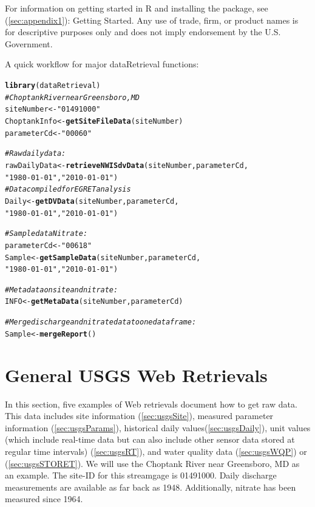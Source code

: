 \documentclass[a4paper,11pt]{article}\usepackage[]{graphicx}\usepackage[]{color}
\makeatletter
\newcommand{\hlstr}[1]{\textcolor[rgb]{0.192,0.494,0.8}{#1}}%
\newcommand{\hlcom}[1]{\textcolor[rgb]{0.678,0.584,0.686}{\textit{#1}}}%
\newcommand{\hlstd}[1]{\textcolor[rgb]{0.345,0.345,0.345}{#1}}%
\newcommand{\hlkwb}[1]{\textcolor[rgb]{0.69,0.353,0.396}{#1}}%
\newcommand{\hlkwd}[1]{\textcolor[rgb]{0.737,0.353,0.396}{\textbf{#1}}}%
\newenvironment{kframe}{%
 \def\at@end@of@kframe{}%
 \ifinner\ifhmode%
  \def\at@end@of@kframe{\end{minipage}}%
  \begin{minipage}{\columnwidth}%
 \fi\fi%
 \def\FrameCommand##1{\hskip\@totalleftmargin \hskip-\fboxsep
 \colorbox{shadecolor}{##1}\hskip-\fboxsep
     \hskip-\linewidth \hskip-\@totalleftmargin \hskip\columnwidth}%
 \MakeFramed {\advance\hsize-\width
   \@totalleftmargin\z@ \linewidth\hsize
   \@setminipage}}%
 {\par\unskip\endMakeFramed%
 \at@end@of@kframe}
\newenvironment{knitrout}{}{} %
\makeatother
\begin{document}
For information on getting started in R and installing the package, see (\ref{sec:appendix1}): Getting Started. Any use of trade, firm, or product names is for descriptive purposes only and does not imply endorsement by the U.S. Government.

A quick workflow for major dataRetrieval functions:

\begin{knitrout}
\color{fgcolor}\begin{kframe}
\begin{alltt}
\hlkwd{library}\hlstd{(dataRetrieval)}
\hlcom{# Choptank River near Greensboro, MD}
\hlstd{siteNumber} \hlkwb{<-} \hlstr{"01491000"}
\hlstd{ChoptankInfo} \hlkwb{<-} \hlkwd{getSiteFileData}\hlstd{(siteNumber)}
\hlstd{parameterCd} \hlkwb{<-} \hlstr{"00060"}

\hlcom{#Raw daily data:}
\hlstd{rawDailyData} \hlkwb{<-} \hlkwd{retrieveNWISdvData}\hlstd{(siteNumber,parameterCd,}
                      \hlstr{"1980-01-01"}\hlstd{,}\hlstr{"2010-01-01"}\hlstd{)}
\hlcom{# Data compiled for EGRET analysis}
\hlstd{Daily} \hlkwb{<-} \hlkwd{getDVData}\hlstd{(siteNumber,parameterCd,}
                      \hlstr{"1980-01-01"}\hlstd{,}\hlstr{"2010-01-01"}\hlstd{)}

\hlcom{# Sample data Nitrate:}
\hlstd{parameterCd} \hlkwb{<-} \hlstr{"00618"}
\hlstd{Sample} \hlkwb{<-} \hlkwd{getSampleData}\hlstd{(siteNumber,parameterCd,}
                      \hlstr{"1980-01-01"}\hlstd{,}\hlstr{"2010-01-01"}\hlstd{)}

\hlcom{# Metadata on site and nitrate:}
\hlstd{INFO} \hlkwb{<-} \hlkwd{getMetaData}\hlstd{(siteNumber,parameterCd)}

\hlcom{# Merge discharge and nitrate data to one dataframe:}
\hlstd{Sample} \hlkwb{<-} \hlkwd{mergeReport}\hlstd{()}
\end{alltt}
\end{kframe}
\end{knitrout}


\section{General USGS Web Retrievals}
\label{sec:genRetrievals}
In this section, five examples of Web retrievals document how to get raw data. This data includes site information (\ref{sec:usgsSite}), measured parameter information (\ref{sec:usgsParams}), historical daily values(\ref{sec:usgsDaily}), unit values (which include real-time data but can also include other sensor data stored at regular time intervals) (\ref{sec:usgsRT}), and water quality data (\ref{sec:usgsWQP}) or (\ref{sec:usgsSTORET}). We will use the Choptank River near Greensboro, MD as an example.  The site-ID for this streamgage is 01491000. Daily discharge measurements are available as far back as 1948.  Additionally, nitrate has been measured since 1964. 
\end{document}
